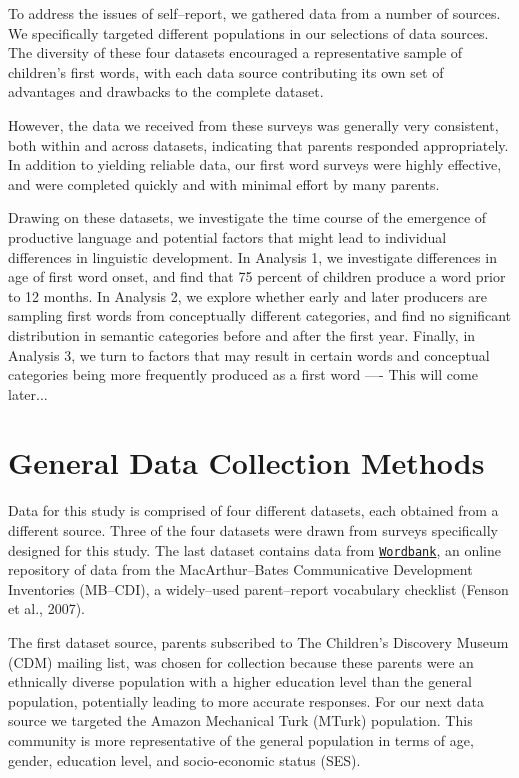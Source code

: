 \documentclass[10pt,letterpaper]{article}
\begin{document}
To address the issues of self--report, we gathered data from a number of sources. We specifically targeted different populations in our selections of data sources. The diversity of these four datasets encouraged a representative sample of children's first words, with each data source contributing its own set of advantages and drawbacks to the complete dataset. 

However, the data we received from these surveys was generally very consistent, both within and across datasets, indicating that parents responded appropriately. In addition to yielding reliable data, our first word surveys were highly effective, and were completed quickly and with minimal effort by many parents. 

Drawing on these datasets, we investigate the time course of the emergence of productive language and potential factors that might lead to individual differences in linguistic development. In Analysis 1, we investigate differences in age of first word onset, and find that 75 percent of children produce a word prior to 12 months. In Analysis 2, we explore whether early and later producers are sampling first words from conceptually different categories, and find no significant distribution in semantic categories before and after the first year. Finally, in Analysis 3, we turn to factors that may result in certain words and conceptual categories being more frequently produced as a first word ---- This will come later...

\section{General Data Collection Methods}
Data for this study is comprised of four different datasets, each obtained from a different source. Three of the four datasets were drawn from surveys specifically designed for this study. The last dataset contains data from \href{http://wordbank.stanford.edu}{\tt{Wordbank}}, an online repository of data from the MacArthur--Bates Communicative Development Inventories (MB--CDI), a widely--used parent--report vocabulary checklist (Fenson et al., 2007).

The first dataset source, parents subscribed to The Children's Discovery Museum (CDM) mailing list, was chosen for collection because these parents were an ethnically diverse population with a higher education level than the general population, potentially leading to more accurate responses. For our next data source we targeted the Amazon Mechanical Turk (MTurk) population. This community is more representative of the general population in terms of age, gender, education level, and socio-economic status (SES). 
\end{document}
